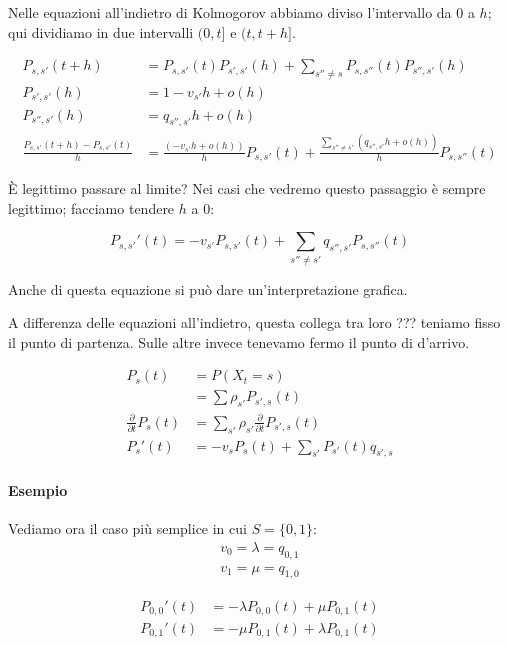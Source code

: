 \documentclass[a4paper,12pt]{book}
\begin{document}
Nelle equazioni all'indietro di Kolmogorov abbiamo diviso l'intervallo da 0 a $ h $; qui dividiamo in due intervalli $ (0, t] $ e $ (t, t+h] $. 

\begin{align*}
	P_{s,s'}(t+h) & = P_{s,s'}(t) P_{s',s'}(h) + \sum_{s'' \ne s} P_{s,s''}(t)P_{s'',s'}(h) \\ %
	P_{s',s'}(h) & = 1 - v_{s'} h + o(h) \\
	P_{s'',s'}(h) & = q_{s'',s'}h + o(h) \\
	\frac{P_{s,s'}(t+h) - P_{s,s'}(t)}{h} & = \frac{(-v_{s'} h + o(h))}{h}P_{s,s'}(t) + \frac{\sum_{s'' \ne s'}(q_{s'',s'} h + o(h) ) }{h} P_{s,s''}(t)
\end{align*}

È legittimo passare al limite? Nei casi che vedremo questo passaggio è sempre legittimo; facciamo tendere $ h $ a 0: %

$$ P_{s,s'}'(t) = -v_{s'} P_{s,s'}(t) + \sum_{s'' \ne s' } q_{s'',s'}P_{s,s''}(t) $$

Anche di questa equazione si può dare un'interpretazione grafica. 

A differenza delle equazioni all'indietro, questa collega tra loro ??? %
teniamo fisso il punto di partenza. Sulle altre invece tenevamo fermo il punto di d'arrivo. 

\begin{align*}
	P_s(t) & = P(X_t = s) \\
	& = \sum \rho_{s'} P_{s',s}(t) \\
	\frac{\partial}{\partial t}P_s(t) & = \sum_{s'} \rho_{s'} \frac{\partial}{\partial t} P_{s',s}(t) \\
	P_s'(t) & = -v_s P_s(t) + \sum_{s'}P_{s'}(t) q_{s',s}
\end{align*}

\paragraph{Esempio }Vediamo ora il caso più semplice in cui $ S = \{0,1\} $:
$$ \begin{array}{c}
	v_0 = \lambda = q_{0,1} \\
	v_1 = \mu = q_{1,0}
\end{array} $$

\begin{align*}
	P_{0,0}'(t) & = -\lambda P_{0,0}(t) + \mu P_{0,1}(t) \\
	P_{0,1}'(t) & = -\mu P_{0,1}(t) + \lambda P_{0,1}(t)
\end{align*}
\end{document}

